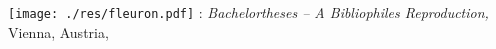 
\hfill

\vfill

\noindent\texttt{[image: ./res/fleuron.pdf]} \hspace{0.5em}
\myName: \textit{Bachelortheses -- A Bibliophiles Reproduction,}
Vienna, Austria, \myTime

%
%
%
%
%
